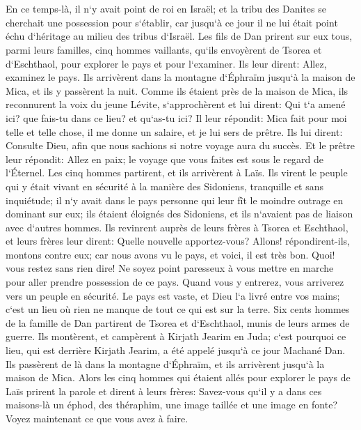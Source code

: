 \chapter{}

\verse En ce temps-là, il n`y avait point de roi en Israël; et la tribu des Danites se cherchait une possession pour s`établir, car jusqu`à ce jour il ne lui était point échu d`héritage au milieu des tribus d`Israël. 
\verse Les fils de Dan prirent sur eux tous, parmi leurs familles, cinq hommes vaillants, qu`ils envoyèrent de Tsorea et d`Eschthaol, pour explorer le pays et pour l`examiner. Ils leur dirent: Allez, examinez le pays. Ils arrivèrent dans la montagne d`Éphraïm jusqu`à la maison de Mica, et ils y passèrent la nuit. 
\verse Comme ils étaient près de la maison de Mica, ils reconnurent la voix du jeune Lévite, s`approchèrent et lui dirent: Qui t`a amené ici? que fais-tu dans ce lieu? et qu`as-tu ici? 
\verse Il leur répondit: Mica fait pour moi telle et telle chose, il me donne un salaire, et je lui sers de prêtre. 
\verse Ils lui dirent: Consulte Dieu, afin que nous sachions si notre voyage aura du succès. 
\verse Et le prêtre leur répondit: Allez en paix; le voyage que vous faites est sous le regard de l`Éternel. 
\verse Les cinq hommes partirent, et ils arrivèrent à Laïs. Ils virent le peuple qui y était vivant en sécurité à la manière des Sidoniens, tranquille et sans inquiétude; il n`y avait dans le pays personne qui leur fît le moindre outrage en dominant sur eux; ils étaient éloignés des Sidoniens, et ils n`avaient pas de liaison avec d`autres hommes. 
\verse Ils revinrent auprès de leurs frères à Tsorea et Eschthaol, et leurs frères leur dirent: Quelle nouvelle apportez-vous? 
\verse Allons! répondirent-ils, montons contre eux; car nous avons vu le pays, et voici, il est très bon. Quoi! vous restez sans rien dire! Ne soyez point paresseux à vous mettre en marche pour aller prendre possession de ce pays. 
\verse Quand vous y entrerez, vous arriverez vers un peuple en sécurité. Le pays est vaste, et Dieu l`a livré entre vos mains; c`est un lieu où rien ne manque de tout ce qui est sur la terre. 
\verse Six cents hommes de la famille de Dan partirent de Tsorea et d`Eschthaol, munis de leurs armes de guerre. 
\verse Ils montèrent, et campèrent à Kirjath Jearim en Juda; c`est pourquoi ce lieu, qui est derrière Kirjath Jearim, a été appelé jusqu`à ce jour Machané Dan. 
\verse Ils passèrent de là dans la montagne d`Éphraïm, et ils arrivèrent jusqu`à la maison de Mica. 
\verse Alors les cinq hommes qui étaient allés pour explorer le pays de Laïs prirent la parole et dirent à leurs frères: Savez-vous qu`il y a dans ces maisons-là un éphod, des théraphim, une image taillée et une image en fonte? Voyez maintenant ce que vous avez à faire. 
